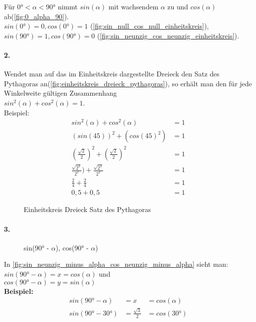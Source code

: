 \documentclass[12pt,a4paper]{article}
\begin{document}
\noindent Für $0° < \alpha < 90°$ nimmt $sin(\alpha)$ mit wachsendem $\alpha$ zu und $cos(\alpha)$ ab(\autoref{fig:0_alpha_90}). \\
$sin(0°) = 0, cos(0°) = 1$ (\autoref{fig:sin_null_cos_null_einheitskreis}), $sin(90°) = 1, cos(90°) = 0$ (\autoref{fig:sin_neunzig_cos_neunzig_einheitskreis}).
\newpage
\paragraph{2.} 
Wendet man auf das im Einheitskreis dargestellte Dreieck den Satz des Pythagoras an(\autoref{fig:einheitskreis_dreieck_pythagoras}), so erhält man den für jede Winkelweite gültigen Zusammenhang \\
$sin^2(\alpha) + cos^2(\alpha) = 1$. \\
Beispiel:
\begin{align}
	sin^2(\alpha) + cos^2(\alpha) &= 1 \tag{1} \\ 
	(sin(45))^2 + (cos(45)^2) &= 1  \tag{2}\\
	(\frac{\sqrt{2}}{2})^2 + (\frac{\sqrt{2}}{2})^2 &= 1 \tag{3}\\
	\frac{\sqrt{2^2}}{2^2}) + \frac{\sqrt{2^2}}{2^2} &= 1 \tag{4}\\
	\frac{2}{4} + \frac{2}{4} &= 1 \tag{5}\\
	0,5 + 0,5 &= 1 \tag{6}
\end{align}

\begin{figure}[hb!]
	\center
	\def\svgwidth{200px}
    
    \caption{Einheitskreis Dreieck Satz des Pythagoras}
  	\label{fig:einheitskreis_dreieck_pythagoras}
\end{figure}
\paragraph{3.}
\begin{wrapfigure}[6]{r}{0.45\textwidth}
	\def\svgwidth{200px}
    
    \caption{sin(90° - $\alpha$), cos(90° - $\alpha$)}
  	\label{fig:sin_neunzig_minus_alpha_cos_neunzig_minus_alpha}
\end{wrapfigure}
In \autoref{fig:sin_neunzig_minus_alpha_cos_neunzig_minus_alpha} sieht man: \\
$sin(90° - \alpha) = x = cos(\alpha)$ und \\
$cos(90° - \alpha) = y = sin(\alpha)$ \\
\textbf{Beispiel:}
\begin{align}
	sin(90° - \alpha) &= x &= cos(\alpha) \tag{1} \\
	sin(90° - 30°) &=  \frac{\sqrt{3}}{2} &= cos(30°) \tag{2}  
\end{align}
\end{document}
